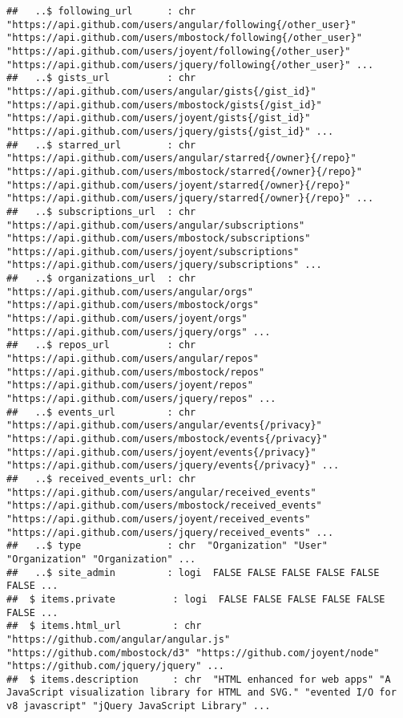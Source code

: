 \documentclass{article}\usepackage[]{graphicx}\usepackage[]{color}
\makeatletter
\newenvironment{kframe}{%
 \def\at@end@of@kframe{}%
 \ifinner\ifhmode%
  \def\at@end@of@kframe{\end{minipage}}%
  \begin{minipage}{\columnwidth}%
 \fi\fi%
 \def\FrameCommand##1{\hskip\@totalleftmargin \hskip-\fboxsep
 \colorbox{shadecolor}{##1}\hskip-\fboxsep
     \hskip-\linewidth \hskip-\@totalleftmargin \hskip\columnwidth}%
 \MakeFramed {\advance\hsize-\width
   \@totalleftmargin\z@ \linewidth\hsize
   \@setminipage}}%
 {\par\unskip\endMakeFramed%
 \at@end@of@kframe}
\newenvironment{knitrout}{}{} %
\makeatother
\begin{document}
\begin{knitrout}
\begin{kframe}
\begin{verbatim}
##   ..$ following_url      : chr  "https://api.github.com/users/angular/following{/other_user}" "https://api.github.com/users/mbostock/following{/other_user}" "https://api.github.com/users/joyent/following{/other_user}" "https://api.github.com/users/jquery/following{/other_user}" ...
##   ..$ gists_url          : chr  "https://api.github.com/users/angular/gists{/gist_id}" "https://api.github.com/users/mbostock/gists{/gist_id}" "https://api.github.com/users/joyent/gists{/gist_id}" "https://api.github.com/users/jquery/gists{/gist_id}" ...
##   ..$ starred_url        : chr  "https://api.github.com/users/angular/starred{/owner}{/repo}" "https://api.github.com/users/mbostock/starred{/owner}{/repo}" "https://api.github.com/users/joyent/starred{/owner}{/repo}" "https://api.github.com/users/jquery/starred{/owner}{/repo}" ...
##   ..$ subscriptions_url  : chr  "https://api.github.com/users/angular/subscriptions" "https://api.github.com/users/mbostock/subscriptions" "https://api.github.com/users/joyent/subscriptions" "https://api.github.com/users/jquery/subscriptions" ...
##   ..$ organizations_url  : chr  "https://api.github.com/users/angular/orgs" "https://api.github.com/users/mbostock/orgs" "https://api.github.com/users/joyent/orgs" "https://api.github.com/users/jquery/orgs" ...
##   ..$ repos_url          : chr  "https://api.github.com/users/angular/repos" "https://api.github.com/users/mbostock/repos" "https://api.github.com/users/joyent/repos" "https://api.github.com/users/jquery/repos" ...
##   ..$ events_url         : chr  "https://api.github.com/users/angular/events{/privacy}" "https://api.github.com/users/mbostock/events{/privacy}" "https://api.github.com/users/joyent/events{/privacy}" "https://api.github.com/users/jquery/events{/privacy}" ...
##   ..$ received_events_url: chr  "https://api.github.com/users/angular/received_events" "https://api.github.com/users/mbostock/received_events" "https://api.github.com/users/joyent/received_events" "https://api.github.com/users/jquery/received_events" ...
##   ..$ type               : chr  "Organization" "User" "Organization" "Organization" ...
##   ..$ site_admin         : logi  FALSE FALSE FALSE FALSE FALSE FALSE ...
##  $ items.private          : logi  FALSE FALSE FALSE FALSE FALSE FALSE ...
##  $ items.html_url         : chr  "https://github.com/angular/angular.js" "https://github.com/mbostock/d3" "https://github.com/joyent/node" "https://github.com/jquery/jquery" ...
##  $ items.description      : chr  "HTML enhanced for web apps" "A JavaScript visualization library for HTML and SVG." "evented I/O for v8 javascript" "jQuery JavaScript Library" ...

\end{verbatim}
\end{kframe}
\end{knitrout}
\end{document}
